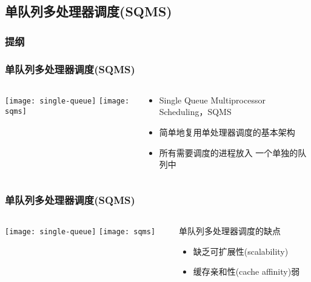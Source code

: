 \subsection{单队列多处理器调度(SQMS)}
\begin{frame}
\frametitle{提纲} %
\tableofcontents %

\end{frame}
\begin{frame}
    \frametitle{单队列多处理器调度(SQMS)}	
\begin{columns}
	\begin{column}{.5\textwidth}
	\Large \centering
    \texttt{[image: single-queue]}
	\texttt{[image: sqms]}	
	\end{column}
	
	\begin{column}{.5\textwidth}
    \begin{itemize}
        \item Single Queue Multiprocessor Scheduling，SQMS
        \item 简单地复用单处理器调度的基本架构
        \item 所有需要调度的进程放入 一个单独的队列中
    \end{itemize}

	\end{column}
\end{columns}
\end{frame}
\begin{frame}
    \frametitle{单队列多处理器调度(SQMS)}	
	\begin{columns}
		\begin{column}{.5\textwidth}
			\Large \centering
			\texttt{[image: single-queue]}
			\texttt{[image: sqms]}	
		\end{column}
		
		\begin{column}{.5\textwidth}
			\large
			单队列多处理器调度的缺点
			

			\begin{itemize}\large
				\item 缺乏可扩展性(scalability)
				\item 缓存亲和性(cache affinity)弱
			\end{itemize}
			
		\end{column}
	\end{columns}
\end{frame}


